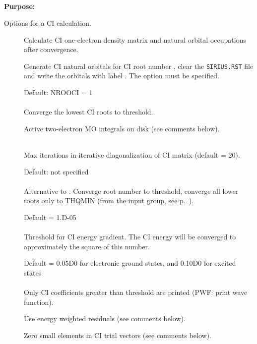 \pagebreak[3]
\subsection{\label{ref-cicinp}}

{\bf Purpose:}

Options for a CI calculation.

\begin{description}
\item[]
  Calculate CI one-electron density matrix and natural
  orbital
  occupations after convergence.

\item[]
  Generate CI natural
  orbitals for CI root
  number ,
  clear the \verb|SIRIUS.RST| file and write the orbitals with label .
  The  option must be specified.

\item[]
  Default: NROOCI = 1\\
   \\
  Converge the lowest  CI roots to threshold.

\item[]
  Active two-electron MO integrals on disk (see comments below).

\item[]
   \\
  Max iterations in iterative diagonalization of CI matrix (default = 20).

\item[]
  Default: not specified\\
   \\
  Alternative to .  Converge root number 
  to threshold, converge all lower roots only to THQMIN
  (from the  input group, see
  p.~\pageref{ref-optinp}).

\item[]
  Default = 1.D-05\\
   \\
  Threshold for CI energy gradient.  The CI energy will be converged to
  approximately the square of this number.

\item[]
  Default = 0.05D0 for electronic ground states, and 0.10D0 for
  excited states\\
   \\
  Only CI coefficients greater than threshold are printed
  (PWF: print wave function).

\item[]
  Use energy weighted residuals (see comments below).

\item[]
  Zero small elements in CI trial vectors (see comments below).
\end{description}


